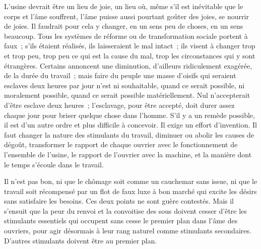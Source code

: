 \documentclass[french,twoside]{book} %
\begin{document}
L'usine devrait être un lieu de joie, un lieu où, même s'il est inévitable que le corps et l'âme souffrent, l'âme puisse aussi pourtant goûter des joies, se nourrir de joies. Il faudrait pour cela y changer, en un sens peu de choses, en un sens beaucoup. Tous les systèmes de réforme ou de transformation sociale portent à faux ; s'ils étaient réalisés, ils laisseraient le mal intact ; ils visent à changer trop et trop peu, trop peu ce qui est la cause du mal, trop les circonstances qui y sont étrangères. Certains annoncent une diminution, d'ailleurs ridiculement exagérée, de la durée du travail ; mais faire du peuple une masse d'oisifs qui seraient esclaves deux heures par jour n'est ni souhaitable, quand ce serait possible, ni moralement possible, quand ce serait possible matériellement. Nul n'accepterait d'être esclave deux heures ; l'esclavage, pour être accepté, doit durer assez chaque jour pour briser quelque chose dans l'homme. S'il y a un remède possible, il est d'un autre ordre et plus difficile à concevoir. Il exige un effort d'invention. Il faut changer la nature des stimulants du travail, diminuer ou abolir les causes de dégoût, transformer le rapport de chaque ouvrier avec le fonctionnement de l'ensemble de l'usine, le rapport de l'ouvrier avec la machine, et la manière dont le temps s'écoule dans le travail.\par
Il n'est pas bon, ni que le chômage soit comme un cauchemar sans issue, ni que le travail soit récompensé par un flot de faux luxe à bon marché qui excite les désirs sans satisfaire les besoins. Ces deux points ne sont guère contestés. Mais il s'ensuit que la peur du renvoi et la convoitise des sous doivent cesser d'être les stimulants essentiels qui occupent sans cesse le premier plan dans l'âme des ouvriers, pour agir désormais à leur rang naturel comme stimulants secondaires. D'autres stimulants doivent être au premier plan.\par
\end{document}
